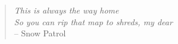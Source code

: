 
%
%

\cleardoublepage

\thispagestyle{empty}
\vspace*{5cm} 
\begin{quote} 
	\begin{flushright}
	
		\textit{This is always the way home}\\
		\textit{So you can rip that map to shreds, my dear}\\
		-- Snow Patrol
		
	\end{flushright}
\end{quote}

\cleardoublepage



